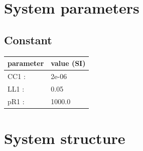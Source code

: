 \documentclass[11pt, oneside]{article}      %
\begin{document}
\section{System parameters}
%
%
\subsection{Constant}
%
\begin{center}
%
\begin{tabular}{ll}
%
\hline
parameter & value (SI)
\\ \hline
CC1 :& 2e-06
\\
LL1 :& 0.05
\\
pR1 :& 1000.0
\\
\hline
\end{tabular}
%
\end{center}
%
\section{System structure}
%
\end{document}
